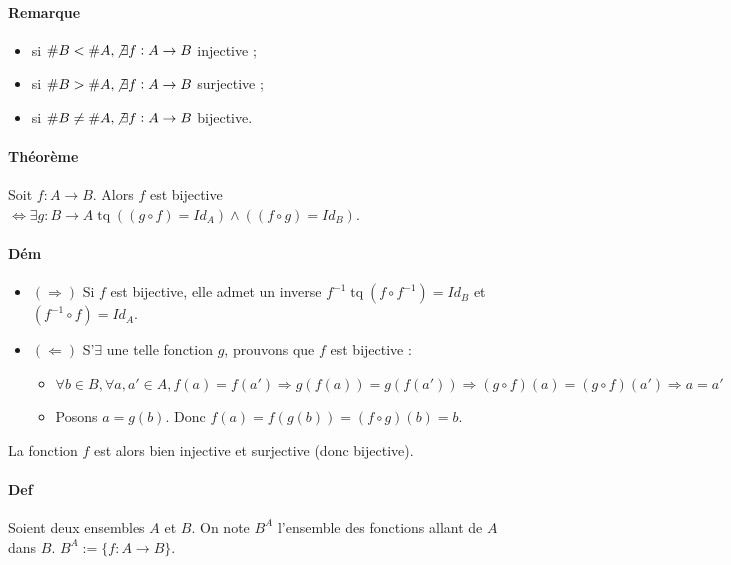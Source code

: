 \documentclass{article}
\newenvironment{lst}
	{\begin{minipage}[t]{.9\linewidth}\begin{itemize}}
	{\end{itemize}\end{minipage}}
\DeclareMathOperator{\tq}{\text{ tq }}
\begin{document}
			\paragraph{Remarque}
			\begin{lst}
				\item si $\#B < \#A, \not \exists f : A \to B$ injective ;
				\item si $\#B > \#A, \not \exists f : A \to B$ surjective ;
				\item si $\#B \neq \#A, \not \exists f : A \to B$ bijective.
			\end{lst}

			\paragraph{Théorème} Soit $f : A \to B$. Alors $f$ est bijective $\iff \exists g : B \to A \tq ((g \circ f) = Id_A) \land ((f \circ g) = Id_B)$.

			\paragraph{Dém}
			\begin{lst}

				\item $(\Rightarrow)$ Si $f$ est bijective, elle admet un inverse $f^{-1} \tq (f \circ f^{-1}) = Id_B$ et $(f^{-1} \circ f) = Id_A$.

				\item $(\Leftarrow)$ S'$\exists $ une telle fonction $g$, prouvons que $f$ est bijective :

				\begin{itemize}
					\item $\forall b \in B, \forall a, a' \in A, f(a) = f(a') \Rightarrow g(f(a)) = g(f(a')) \Rightarrow (g \circ f)(a) = (g \circ f)(a') \Rightarrow a = a'$
					\item Posons $a = g(b)$. Donc $f(a) = f(g(b)) = (f \circ g)(b) = b$.
				\end{itemize}
			\end{lst}

			La fonction $f$ est alors bien injective et surjective (donc bijective).

			\paragraph{Def} Soient deux ensembles $A$ et $B$. On note $B^A$ l'ensemble des fonctions allant de $A$ dans $B$. $B^A := \{f : A \to B\}$.
\end{document}
